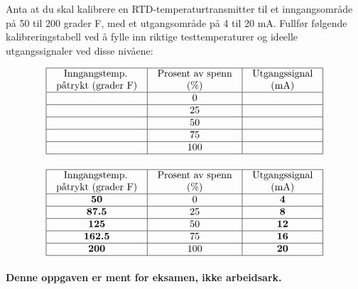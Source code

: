 

Anta at du skal kalibrere en RTD-temperaturtransmitter til et inngangsområde på 50 til 200 grader F, med et utgangsområde på 4 til 20 mA. Fullfør følgende kalibreringstabell ved å fylle inn riktige testtemperaturer og ideelle utgangssignaler ved disse nivåene:


$$\vbox{\offinterlineskip
\halign{\strut
\vrule \quad\hfil # \ \hfil &
\vrule \quad\hfil # \ \hfil &
\vrule \quad\hfil # \ \hfil \vrule \cr
\noalign{\hrule}
%
Inngangstemp. & Prosent av spenn & Utgangssignal \cr
%
påtrykt (grader F) & (\%) & (mA) \cr
%
\noalign{\hrule}
%
 & 0 &  \cr
%
\noalign{\hrule}
%
 & 25 &  \cr
%
\noalign{\hrule}
%
 & 50 &  \cr
%
\noalign{\hrule}
%
 & 75 &  \cr
%
\noalign{\hrule}
%
 & 100 &  \cr
%
\noalign{\hrule}
} %
}$$ %








$$\vbox{\offinterlineskip
\halign{\strut
\vrule \quad\hfil # \ \hfil &
\vrule \quad\hfil # \ \hfil &
\vrule \quad\hfil # \ \hfil \vrule \cr
\noalign{\hrule}
%
Inngangstemp. & Prosent av spenn & Utgangssignal \cr
%
påtrykt (grader F) & (\%) & (mA) \cr
%
\noalign{\hrule}
%
{\bf 50} & 0 & {\bf 4} \cr
%
\noalign{\hrule}
%
{\bf 87.5} & 25 & {\bf 8} \cr
%
\noalign{\hrule}
%
{\bf 125} & 50 & {\bf 12} \cr
%
\noalign{\hrule}
%
{\bf 162.5} & 75 & {\bf 16} \cr
%
\noalign{\hrule}
%
{\bf 200} & 100 & {\bf 20} \cr
%
\noalign{\hrule}
} %
}$$ %







{\bf Denne oppgaven er ment for eksamen, ikke arbeidsark.}

